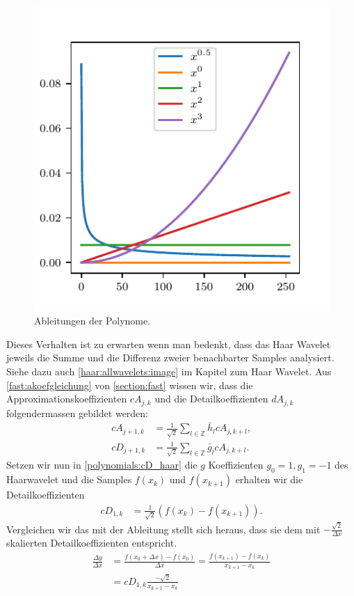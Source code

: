 \begin{refsection}
\begin{figure}
    \centering
    \includegraphics{papers/polynomials/images/polynomials_signals_diff.pdf}
    \caption{Ableitungen der Polynome.\label{polynomials:diff}}
\end{figure}

Dieses Verhalten ist zu erwarten wenn man bedenkt, dass das Haar Wavelet
jeweils die Summe und die Differenz zweier benachbarter Samples analysiert.
Siehe dazu auch \cref{haar:allwavelets:image} im Kapitel zum Haar Wavelet. Aus
\cref{fast:akoefgleichung} von \cref{section:fast} wissen wir, dass die
Approximationskoeffizienten $cA_{j,k}$ und die Detailkoeffizienten $dA_{j,k}$
folgendermassen gebildet werden:
\begin{align}
cA_{j+1,k}
&=
\frac{1}{\sqrt{2}} \sum_{l\in\mathbb Z} \bar{h}_l cA_{j,k+l}, \nonumber
\\
cD_{j+1,k}
&=
\frac{1}{\sqrt{2}} \sum_{l\in\mathbb Z} \bar{g}_l cA_{j,k+l}.
\label{polynomials:cD_haar}
\end{align}
Setzen wir nun in \cref{polynomials:cD_haar} die $g$ Koeffizienten $g_0 = 1,
g_1 = -1$ des Haarwavelet und die Samples $f(x_k)$ und $f(x_{k + 1})$ erhalten
wir die Detailkoeffizienten
\begin{align}
    cD_{1,k} & = \frac{1}{\sqrt{2}}\left(f(x_k) - f(x_{k + 1})\right).
\end{align}
Vergleichen wir das mit der Ableitung stellt sich heraus, dass sie dem mit
$-\frac{\sqrt{2}}{\Delta x}$ skalierten Detailkoeffizienten entspricht.
\begin{align}
\frac{\Delta y}{\Delta x} &= \frac{f(x_0+\Delta x) - f(x_0)}{\Delta x}
                           = \frac{f(x_{k+1}) - f(x_k)}{x_{k+1} - x_k} \nonumber \\
                          &= cD_{1,k} \frac{-\sqrt{2}}{x_{k+1} - x_k}
                          \label{polynomials:eq:cD_haar_ableitung}
\end{align}


\end{refsection}
